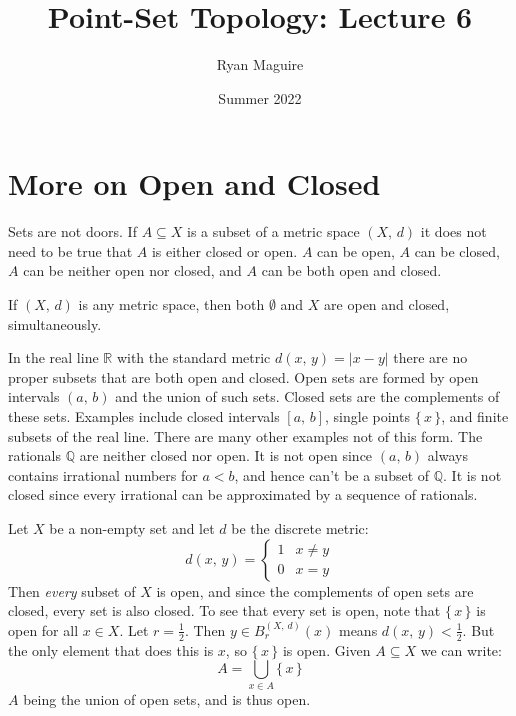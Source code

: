 \documentclass{article}
\title{Point-Set Topology: Lecture 6}
\author{Ryan Maguire}
\date{Summer 2022}
\theoremstyle{plain}
\theoremstyle{normal}
\newenvironment{example}{%
    \pushQED{\qed}\renewcommand{\qedsymbol}{$\blacksquare$}\examplex%
}{%
    \popQED\endexamplex%
}
\begin{document}
    \maketitle
    \section{More on Open and Closed}
        Sets are not doors. If $A\subseteq{X}$ is a subset of a metric space
        $(X,\,d)$ it does not need to be true that $A$ is either closed or
        open. $A$ can be open, $A$ can be closed, $A$ can be neither open nor
        closed, and $A$ can be both open and closed.
        \begin{example}
            If $(X,\,d)$ is any metric space, then both
            $\emptyset$ and $X$ are open and closed, simultaneously.
        \end{example}
        \begin{example}
            In the real line $\mathbb{R}$ with the standard metric
            $d(x,\,y)=|x-y|$ there are no proper subsets that are both open and
            closed. Open sets are formed by open intervals $(a,\,b)$ and the
            union of such sets. Closed sets are the complements of these sets.
            Examples include closed intervals $[a,\,b]$, single points
            $\{\,x\,\}$, and finite subsets of the real line. There are many
            other examples not of this form. The rationals $\mathbb{Q}$ are
            neither closed nor open. It is not open since $(a,\,b)$ always
            contains irrational numbers for $a<b$, and hence can't be a
            subset of $\mathbb{Q}$. It is not closed since every irrational can
            be approximated by a sequence of rationals.
        \end{example}
        \begin{example}
            Let $X$ be a non-empty set and let $d$ be the discrete metric:
            \begin{equation}
                d(x,\,y)=
                \begin{cases}
                    1&x\ne{y}\\
                    0&x=y
                \end{cases}
            \end{equation}
            Then \textit{every} subset of $X$ is open, and since the complements
            of open sets are closed, every set is also closed. To see that every
            set is open, note that $\{\,x\,\}$ is open for all $x\in{X}$.
            Let $r=\frac{1}{2}$. Then
            $y\in{B}_{r}^{(X,\,d)}(x)$ means $d(x,\,y)<\frac{1}{2}$. But the
            only element that does this is $x$, so $\{\,x\,\}$ is open.
            Given $A\subseteq{X}$ we can write:
            \begin{equation}
                A=\bigcup_{x\in{A}}\{\,x\,\}
            \end{equation}
            $A$ being the union of open sets, and is thus open.
        \end{example}
\end{document}
